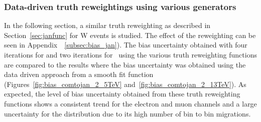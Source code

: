 \begin{table}[htpb]
\centering
{}
\caption{Approximate numbers for the bias uncertainty in the first bin of the unfolded \ptz distribution using \ptdilep\ (two iterations) and \ut\ (four iterations) with 2~\GeV\ and 5~\GeV\ bins at $\sqrt{s} = 13$~\TeV\ . The uncertainty is shown for different inputs used for the reweighting of truth MC distributions. }
\label{tab:bias_first_bin_13TeV}
\end{table}


\subsubsection{Data-driven truth reweightings using various generators}
In the following section, a similar truth reweighting as described in Section~\ref{sec:janfunc} for W events is studied. The effect of the reweighting can be seen in Appendix~~\ref{subsec:bias_jan}).
The bias uncertainty obtained with four iterations for \ut and two iterations for \ptdilep\ using the various truth reweighting functions are compared to the results where the bias uncertainty was obtained using the data driven approach from a smooth fit function (Figures~\ref{fig:bias_comtojan_2_5TeV} and~\ref{fig:bias_comtojan_2_13TeV}).
As expected, the level of bias uncertainty obtained from these truth reweighting functions shows a consistent trend for the electron and muon channels and a large uncertainty for the \ut distribution due to its high number of bin to bin migrations.

